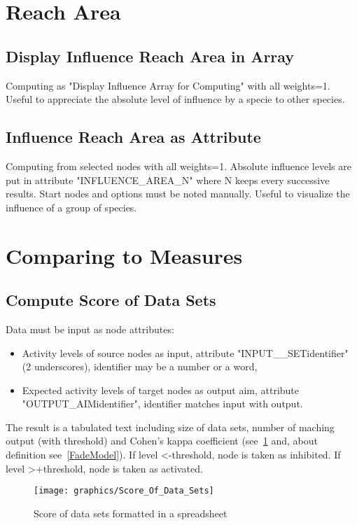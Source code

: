 \documentclass[11pt]{article}
\begin{document}
\section{Reach Area}

\subsection{Display Influence Reach Area in Array}
Computing as "Display Influence Array for Computing" with all weights=1. Useful to appreciate the absolute level of influence by a specie to other species.

\subsection{Influence Reach Area as Attribute}
Computing from selected nodes with all weights=1. Absolute influence levels are put in attribute "INFLUENCE\_AREA\_N" where N keeps every successive results. Start nodes and options must be noted manually. Useful to visualize the influence of a group of species.

\section{Comparing to Measures}

\subsection{Compute Score of Data Sets }
Data must be input as node attributes:
\begin{itemize}
\item Activity levels of source nodes as input, attribute "INPUT\_\_SETidentifier" (2 underscores), identifier may be a number or a word, 
\item Expected activity levels of target nodes as output aim, attribute "OUTPUT\_AIMidentifier", identifier matches input with output.
\end{itemize}
The result is a tabulated text including size of data sets, number of maching output (with threshold) and Cohen's kappa coefficient (see~\ref{Score_Of_Data_Sets} and, about definition see~\ref{FadeModel}).
If level \textless -threshold, node is taken as inhibited. If level \textgreater +threshold, node is taken as activated.

\begin{figure}
\centering
\texttt{[image: graphics/Score\_Of\_Data\_Sets]}
\caption{Score of data sets formatted in a spreadsheet}
\label{Score_Of_Data_Sets}
\end{figure}
\end{document}
